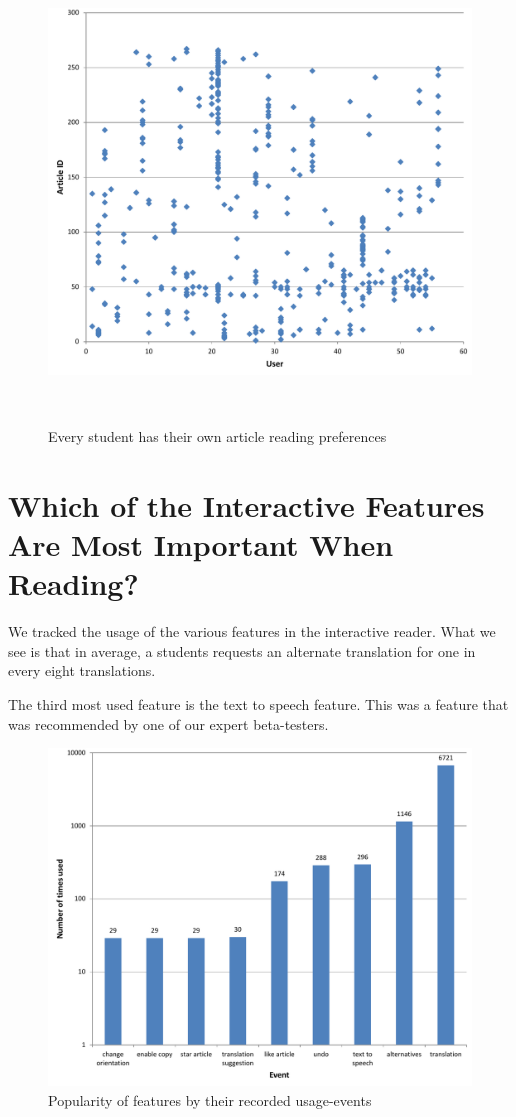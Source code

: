 \begin{figure}[h!]
\centering
  \includegraphics[width=\columnwidth]{figures/users_articles}
  \caption{Every student has their own article reading preferences}~\label{fig:registrations}
\end{figure}

\newpage
\section{Which of the Interactive Features Are Most Important When Reading?}
We tracked the usage of the various features in the interactive reader. What we see is that in average, a students requests an alternate translation for one in every eight translations. 

The third most used feature is the text to speech feature. This was a feature that was recommended by one of our expert beta-testers. 

\begin{figure}[h!]
\centering
  \includegraphics[width=0.9\columnwidth]{figures/reader_feature_usage}
  \caption{Popularity of features by their recorded usage-events}
\end{figure}

